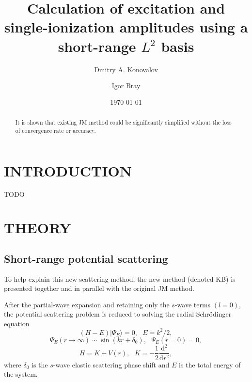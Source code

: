 \documentclass[aip
, pra
, showpacs
, aps
, twocolumn
, groupedaddress
, floatfix
]{revtex4}
\newcommand{\beq}{\begin{equation}}
\newcommand{\eeq}{\end{equation}}
\begin{document}
\title {Calculation of excitation and single-ionization amplitudes using a short-range $L^2$ basis}

\author{Dmitry A. Konovalov}

\author{Igor Bray}


\date{\today}

\begin{abstract}
It is shown that existing JM method could be significantly simplified without the loss of convergence rate or accuracy.

\end{abstract}

\maketitle

\section{INTRODUCTION}
TODO

\section{THEORY}
\subsection{Short-range potential scattering}
To help explain this new scattering method, the new method (denoted KB) is presented together and in parallel with the original JM method.

After the partial-wave expansion and retaining only the $s$-wave terms $(l=0)$, 
the potential scattering problem is reduced \cite{LL85, Taylor72} to solving the radial Schr\"odinger equation
\beq
(H-E) | \Psi_E \rangle =0, \ \ \ E=k^2/2,
\eeq
\beq
\Psi_E(r \rightarrow \infty) \sim \sin(kr+\delta_0), \ \ \ \Psi_E(r= 0)=0,
\eeq
\beq
H=K+V(r), \ \ \ K=-\frac{1}{2} \frac{\mbox{d}^2}{\mbox{d}r^2}, \label{K}
\eeq
where $\delta_0$ is the $s$-wave elastic scattering phase shift and $E$ is the total energy of the system.
\end{document}
